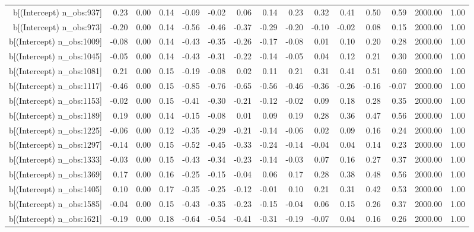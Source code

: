 \begin{table}[ht]
\begin{tabular}{rrrrrrrrrrrrrrr}
  b[(Intercept) n\_obs:937] & 0.23 & 0.00 & 0.14 & -0.09 & -0.02 & 0.06 & 0.14 & 0.23 & 0.32 & 0.41 & 0.50 & 0.59 & 2000.00 & 1.00 \\ 
  b[(Intercept) n\_obs:973] & -0.20 & 0.00 & 0.14 & -0.56 & -0.46 & -0.37 & -0.29 & -0.20 & -0.10 & -0.02 & 0.08 & 0.15 & 2000.00 & 1.00 \\ 
  b[(Intercept) n\_obs:1009] & -0.08 & 0.00 & 0.14 & -0.43 & -0.35 & -0.26 & -0.17 & -0.08 & 0.01 & 0.10 & 0.20 & 0.28 & 2000.00 & 1.00 \\ 
  b[(Intercept) n\_obs:1045] & -0.05 & 0.00 & 0.14 & -0.43 & -0.31 & -0.22 & -0.14 & -0.05 & 0.04 & 0.12 & 0.21 & 0.30 & 2000.00 & 1.00 \\ 
  b[(Intercept) n\_obs:1081] & 0.21 & 0.00 & 0.15 & -0.19 & -0.08 & 0.02 & 0.11 & 0.21 & 0.31 & 0.41 & 0.51 & 0.60 & 2000.00 & 1.00 \\ 
  b[(Intercept) n\_obs:1117] & -0.46 & 0.00 & 0.15 & -0.85 & -0.76 & -0.65 & -0.56 & -0.46 & -0.36 & -0.26 & -0.16 & -0.07 & 2000.00 & 1.00 \\ 
  b[(Intercept) n\_obs:1153] & -0.02 & 0.00 & 0.15 & -0.41 & -0.30 & -0.21 & -0.12 & -0.02 & 0.09 & 0.18 & 0.28 & 0.35 & 2000.00 & 1.00 \\ 
  b[(Intercept) n\_obs:1189] & 0.19 & 0.00 & 0.14 & -0.15 & -0.08 & 0.01 & 0.09 & 0.19 & 0.28 & 0.36 & 0.47 & 0.56 & 2000.00 & 1.00 \\ 
  b[(Intercept) n\_obs:1225] & -0.06 & 0.00 & 0.12 & -0.35 & -0.29 & -0.21 & -0.14 & -0.06 & 0.02 & 0.09 & 0.16 & 0.24 & 2000.00 & 1.00 \\ 
  b[(Intercept) n\_obs:1297] & -0.14 & 0.00 & 0.15 & -0.52 & -0.45 & -0.33 & -0.24 & -0.14 & -0.04 & 0.04 & 0.14 & 0.23 & 2000.00 & 1.00 \\ 
  b[(Intercept) n\_obs:1333] & -0.03 & 0.00 & 0.15 & -0.43 & -0.34 & -0.23 & -0.14 & -0.03 & 0.07 & 0.16 & 0.27 & 0.37 & 2000.00 & 1.00 \\ 
  b[(Intercept) n\_obs:1369] & 0.17 & 0.00 & 0.16 & -0.25 & -0.15 & -0.04 & 0.06 & 0.17 & 0.28 & 0.38 & 0.48 & 0.56 & 2000.00 & 1.00 \\ 
  b[(Intercept) n\_obs:1405] & 0.10 & 0.00 & 0.17 & -0.35 & -0.25 & -0.12 & -0.01 & 0.10 & 0.21 & 0.31 & 0.42 & 0.53 & 2000.00 & 1.00 \\ 
  b[(Intercept) n\_obs:1585] & -0.04 & 0.00 & 0.15 & -0.43 & -0.35 & -0.23 & -0.15 & -0.04 & 0.06 & 0.15 & 0.26 & 0.37 & 2000.00 & 1.00 \\ 
  b[(Intercept) n\_obs:1621] & -0.19 & 0.00 & 0.18 & -0.64 & -0.54 & -0.41 & -0.31 & -0.19 & -0.07 & 0.04 & 0.16 & 0.26 & 2000.00 & 1.00 \\ 

\end{tabular}
\end{table}
